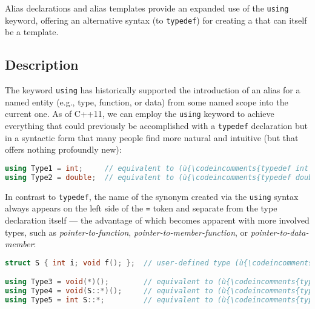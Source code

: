 

Alias declarations and alias templates provide an expanded use of the
\lstinline!using! keyword, offering an alternative syntax (to
\lstinline!typedef!) for creating a  that can itself be
a template.

\subsection[Description]{Description}\label{description}

The keyword \lstinline!using! has historically supported the introduction
of an alias for a named entity (e.g., type, function, or data) from some
named scope into the current one.
As of C++11, we can
employ the \lstinline!using! keyword to achieve everything that could
previously be accomplished with a \lstinline!typedef! declaration but in a
syntactic form that many people find more natural and intuitive (but
that offers nothing profoundly new):

\begin{lstlisting}[language=C++]
using Type1 = int;     // equivalent to (ù{\codeincomments{typedef int Type1;}}ù)
using Type2 = double;  // equivalent to (ù{\codeincomments{typedef double Type2;}}ù)
\end{lstlisting}

\noindent In contrast to \lstinline!typedef!, the name of the synonym created via the
\lstinline!using! syntax always appears on the left side of the \lstinline!=!
token and separate from the type declaration itself --- the advantage of
which becomes apparent with more involved types, such as
\emph{pointer-to-function}, \emph{pointer-to-member-function}, or
\emph{pointer-to-data-member}:

\begin{lstlisting}[language=C++]
struct S { int i; void f(); };  // user-defined type (ù{\codeincomments{S}}ù) defined at file scope

using Type3 = void(*)();        // equivalent to (ù{\codeincomments{typedef void(*Type3)();}}ù)
using Type4 = void(S::*)();     // equivalent to (ù{\codeincomments{typedef void(S::*Type4)();}}ù)
using Type5 = int S::*;         // equivalent to (ù{\codeincomments{typedef int S::*Type5;}}ù)
\end{lstlisting}

